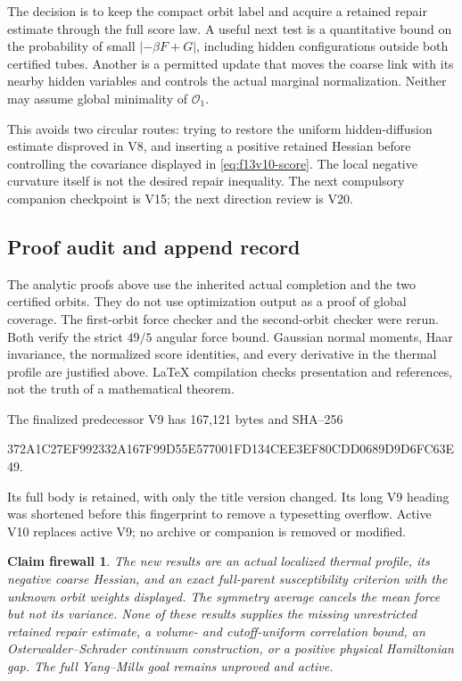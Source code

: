 \documentclass[11pt,oneside]{article}
\newtheorem{firewall}[theorem]{Claim firewall}
\begin{document}
The decision is to keep the compact orbit label and
acquire a retained repair estimate through the full
score law. A useful next test is a quantitative bound
on the probability of small \(|-\beta F+G|\), including
hidden configurations outside both certified tubes.
Another is a permitted update that moves the coarse
link with its nearby hidden variables and controls the
actual marginal normalization. Neither may assume
global minimality of \(\mathcal O_1\).

This avoids two circular routes: trying to restore the
uniform hidden-diffusion estimate disproved in V8, and
inserting a positive retained Hessian before controlling
the covariance displayed in \eqref{eq:f13v10-score}.
The local negative curvature itself is not the desired
repair inequality. The next compulsory companion
checkpoint is V15; the next direction review is V20.

\subsection{Proof audit and append record}

The analytic proofs above use the inherited actual
completion and the two certified orbits. They do not
use optimization output as a proof of global coverage.
The first-orbit force checker
and the second-orbit checker
were rerun. Both verify the strict \(49/5\) angular
force bound. Gaussian normal moments, Haar invariance,
the normalized score identities, and every derivative
in the thermal profile are justified above. LaTeX
compilation checks presentation and references, not
the truth of a mathematical theorem.

The finalized predecessor V9 has 167,121 bytes and
SHA--256
\begin{center}\scriptsize\ttfamily
372A1C27EF992332A167F99D55E577001FD134CEE3EF80CDD0689D9D6FC63E49.
\end{center}
Its full body is retained, with only the title version
changed. Its long V9 heading was shortened before this
fingerprint to remove a typesetting overflow. Active
V10 replaces active V9; no archive or companion is
removed or modified.

\begin{firewall}
The new results are an actual localized thermal profile,
its negative coarse Hessian, and an exact
full-parent susceptibility criterion with the unknown
orbit weights displayed. The symmetry average cancels
the mean force but not its variance. None of these
results supplies the missing unrestricted retained
repair estimate, a volume- and cutoff-uniform
correlation bound, an Osterwalder--Schrader continuum
construction, or a positive physical Hamiltonian gap.
The full Yang--Mills goal remains unproved and active.
\end{firewall}
\end{document}
